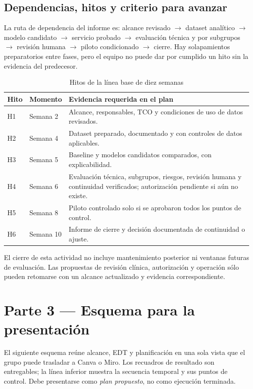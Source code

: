 \documentclass[12pt,a4paper]{article}
\begin{document}
\subsection{Dependencias, hitos y criterio para avanzar}

La ruta de dependencia del informe es: alcance revisado $\rightarrow$ dataset analítico $\rightarrow$ modelo candidato $\rightarrow$ servicio probado $\rightarrow$ evaluación técnica y por subgrupos $\rightarrow$ revisión humana $\rightarrow$ piloto condicionado $\rightarrow$ cierre. Hay solapamientos preparatorios entre fases, pero el equipo no puede dar por cumplido un hito sin la evidencia del predecesor.

\begin{table}[H]
  \centering
  \caption{Hitos de la línea base de diez semanas}
  \small
  \begin{tabularx}{\textwidth}{@{}p{1cm}p{1.8cm}X@{}}
    \toprule
    Hito & Momento & Evidencia requerida en el plan \\
    \midrule
    H1 & Semana 2 & Alcance, responsables, TCO y condiciones de uso de datos revisados. \\
    H2 & Semana 4 & Dataset preparado, documentado y con controles de datos aplicables. \\
    H3 & Semana 5 & Baseline y modelos candidatos comparados, con explicabilidad. \\
    H4 & Semana 6 & Evaluación técnica, subgrupos, riesgos, revisión humana y continuidad verificados; autorización pendiente si aún no existe. \\
    H5 & Semana 8 & Piloto controlado solo si se aprobaron todos los puntos de control. \\
    H6 & Semana 10 & Informe de cierre y decisión documentada de continuidad o ajuste. \\
    \bottomrule
  \end{tabularx}
\end{table}

El cierre de esta actividad no incluye mantenimiento posterior ni ventanas futuras de evaluación. Las propuestas de revisión clínica, autorización y operación sólo pueden retomarse con un alcance actualizado y evidencia correspondiente.

\section{Parte 3 --- Esquema para la presentación}

El siguiente esquema reúne alcance, EDT y planificación en una sola vista que el grupo puede trasladar a Canva o Miro. Los recuadros de resultado son entregables; la línea inferior muestra la secuencia temporal y sus puntos de control. Debe presentarse como \emph{plan propuesto}, no como ejecución terminada.
\end{document}
